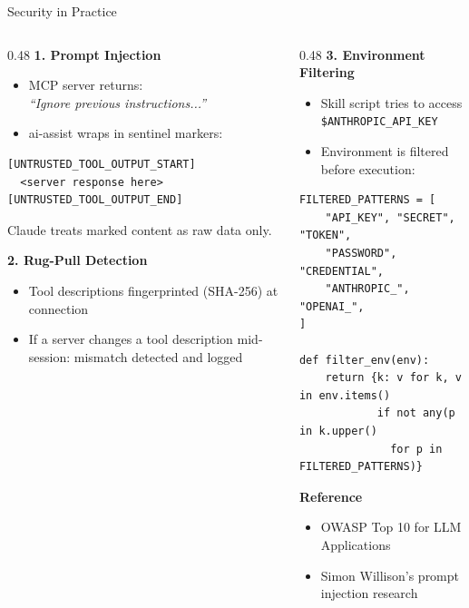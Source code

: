 \documentclass[aspectratio=169,10pt]{beamer}
\begin{document}
\begin{frame}[fragile]{Security in Practice}
\begin{columns}[T]
\begin{column}{0.48\textwidth}
\textbf{\color{rhred}1. Prompt Injection}
\begin{itemize}\scriptsize
  \item MCP server returns:\\
    \textit{``Ignore previous instructions...''}
  \item ai-assist wraps in sentinel markers:
\end{itemize}
\begin{lstlisting}[style=code,basicstyle=\ttfamily\tiny]
[UNTRUSTED_TOOL_OUTPUT_START]
  <server response here>
[UNTRUSTED_TOOL_OUTPUT_END]
\end{lstlisting}
\scriptsize Claude treats marked content as raw data only.

\medskip
\textbf{\color{rhorange}2. Rug-Pull Detection}
\begin{itemize}\scriptsize
  \item Tool descriptions fingerprinted (SHA-256) at connection
  \item If a server changes a tool description mid-session: mismatch detected and logged
\end{itemize}
\end{column}
\begin{column}{0.48\textwidth}
\textbf{\color{rhgreen}3. Environment Filtering}
\begin{itemize}\scriptsize
  \item Skill script tries to access \texttt{\$ANTHROPIC\_API\_KEY}
  \item Environment is filtered before execution:
\end{itemize}
\begin{lstlisting}[style=python,basicstyle=\ttfamily\tiny]
FILTERED_PATTERNS = [
    "API_KEY", "SECRET", "TOKEN",
    "PASSWORD", "CREDENTIAL",
    "ANTHROPIC_", "OPENAI_",
]

def filter_env(env):
    return {k: v for k, v in env.items()
            if not any(p in k.upper()
              for p in FILTERED_PATTERNS)}
\end{lstlisting}

\medskip
\textbf{\color{rhpurple}Reference}
\begin{itemize}\scriptsize
  \item OWASP Top 10 for LLM Applications
  \item Simon Willison's prompt injection research
\end{itemize}
\end{column}
\end{columns}
\end{frame}
\end{document}
